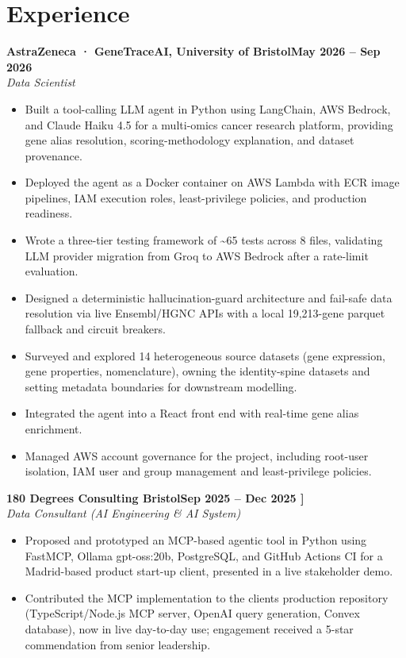 \documentclass[a4paper,11pt]{article}
\newcommand{\entry}[4]{\needspace{4\baselineskip}\noindent\textbf{#1}\hfill\textbf{#2}\\ \textit{#3}\hfill\textit{#4}\par}
\begin{document}
\section{Experience}
\entry{AstraZeneca · GeneTraceAI, University of Bristol}{May 2026 – Sep 2026}{Data Scientist}{}
\begin{itemize}
  \item Built a tool-calling LLM agent in Python using LangChain, AWS Bedrock, and Claude Haiku 4.5 for a multi-omics cancer research platform, providing gene alias resolution, scoring-methodology explanation, and dataset provenance.
  \item Deployed the agent as a Docker container on AWS Lambda with ECR image pipelines, IAM execution roles, least-privilege policies, and production readiness.
  \item Wrote a three-tier testing framework of \textasciitilde{}65 tests across 8 files, validating LLM provider migration from Groq to AWS Bedrock after a rate-limit evaluation.
  \item Designed a deterministic hallucination-guard architecture and fail-safe data resolution via live Ensembl/HGNC APIs with a local 19,213-gene parquet fallback and circuit breakers.
  \item Surveyed and explored 14 heterogeneous source datasets (gene expression, gene properties, nomenclature), owning the identity-spine datasets and setting metadata boundaries for downstream modelling.
  \item Integrated the agent into a React front end with real-time gene alias enrichment.
  \item Managed AWS account governance for the project, including root-user isolation, IAM user and group management and least-privilege policies.
\end{itemize}
\vspace{4pt}
\entry{180 Degrees Consulting Bristol}{Sep 2025 – Dec 2025   ]}{Data Consultant (AI Engineering \& AI System)}{}
\begin{itemize}
  \item Proposed and prototyped an MCP-based agentic tool in Python using FastMCP, Ollama gpt-oss:20b, PostgreSQL, and GitHub Actions CI for a Madrid-based product start-up client, presented in a live stakeholder demo.
  \item Contributed the MCP implementation to the client\textquotesingle{}s production repository (TypeScript/Node.js MCP server, OpenAI query generation, Convex database), now in live day-to-day use; engagement received a 5-star commendation from senior leadership.
\end{itemize}
\end{document}
